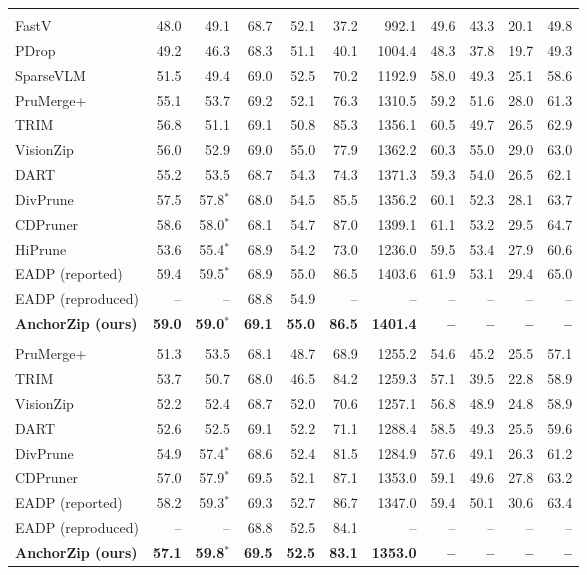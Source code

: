 \documentclass[10pt,a4paper]{article}
\begin{document}
{\begin{tabular}{lrrrrrrrrrr}
\rowcolor{black!12}\multicolumn{11}{c}{\textit{Retain 64 tokens}} \\
FastV & 48.0 & 49.1 & 68.7 & 52.1 & 37.2 & 992.1 & 49.6 & 43.3 & 20.1 & 49.8 \\
PDrop & 49.2 & 46.3 & 68.3 & 51.1 & 40.1 & 1004.4 & 48.3 & 37.8 & 19.7 & 49.3 \\
SparseVLM & 51.5 & 49.4 & 69.0 & 52.5 & 70.2 & 1192.9 & 58.0 & 49.3 & 25.1 & 58.6 \\
PruMerge+ & 55.1 & 53.7 & 69.2 & 52.1 & 76.3 & 1310.5 & 59.2 & 51.6 & 28.0 & 61.3 \\
TRIM & 56.8 & 51.1 & 69.1 & 50.8 & 85.3 & 1356.1 & 60.5 & 49.7 & 26.5 & 62.9 \\
VisionZip & 56.0 & 52.9 & 69.0 & 55.0 & 77.9 & 1362.2 & 60.3 & 55.0 & 29.0 & 63.0 \\
DART & 55.2 & 53.5 & 68.7 & 54.3 & 74.3 & 1371.3 & 59.3 & 54.0 & 26.5 & 62.1 \\
DivPrune & 57.5 & 57.8$^{*}$ & 68.0 & 54.5 & 85.5 & 1356.2 & 60.1 & 52.3 & 28.1 & 63.7 \\
CDPruner & 58.6 & 58.0$^{*}$ & 68.1 & 54.7 & 87.0 & 1399.1 & 61.1 & 53.2 & 29.5 & 64.7 \\
HiPrune & 53.6 & 55.4$^{*}$ & 68.9 & 54.2 & 73.0 & 1236.0 & 59.5 & 53.4 & 27.9 & 60.6 \\
EADP (reported) & 59.4 & 59.5$^{*}$ & 68.9 & 55.0 & 86.5 & 1403.6 & 61.9 & 53.1 & 29.4 & 65.0 \\
EADP (reproduced) & -- & -- & 68.8 & 54.9 & -- & -- & -- & -- & -- & -- \\
\textbf{AnchorZip (ours)} & \textbf{59.0} & \textbf{59.0$^{*}$} & \textbf{69.1} & \textbf{55.0} & \textbf{86.5} & \textbf{1401.4} & \textbf{--} & \textbf{--} & \textbf{--} & \textbf{--} \\
\rowcolor{black!12}\multicolumn{11}{c}{\textit{Retain 32 tokens}} \\
PruMerge+ & 51.3 & 53.5 & 68.1 & 48.7 & 68.9 & 1255.2 & 54.6 & 45.2 & 25.5 & 57.1 \\
TRIM & 53.7 & 50.7 & 68.0 & 46.5 & 84.2 & 1259.3 & 57.1 & 39.5 & 22.8 & 58.9 \\
VisionZip & 52.2 & 52.4 & 68.7 & 52.0 & 70.6 & 1257.1 & 56.8 & 48.9 & 24.8 & 58.9 \\
DART & 52.6 & 52.5 & 69.1 & 52.2 & 71.1 & 1288.4 & 58.5 & 49.3 & 25.5 & 59.6 \\
DivPrune & 54.9 & 57.4$^{*}$ & 68.6 & 52.4 & 81.5 & 1284.9 & 57.6 & 49.1 & 26.3 & 61.2 \\
CDPruner & 57.0 & 57.9$^{*}$ & 69.5 & 52.1 & 87.1 & 1353.0 & 59.1 & 49.6 & 27.8 & 63.2 \\
EADP (reported) & 58.2 & 59.3$^{*}$ & 69.3 & 52.7 & 86.7 & 1347.0 & 59.4 & 50.1 & 30.6 & 63.4 \\
EADP (reproduced) & -- & -- & 68.8 & 52.5 & 84.1 & -- & -- & -- & -- & -- \\
\textbf{AnchorZip (ours)} & \textbf{57.1} & \textbf{59.8$^{*}$} & \textbf{69.5} & \textbf{52.5} & \textbf{83.1} & \textbf{1353.0} & \textbf{--} & \textbf{--} & \textbf{--} & \textbf{--} \\
\bottomrule\end{tabular}}\endgroup\par\medskip
\end{document}
